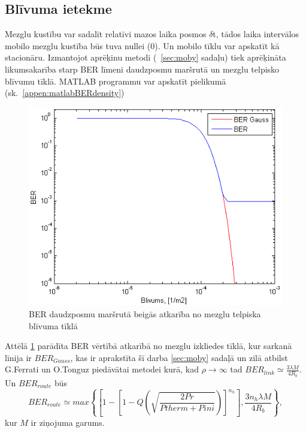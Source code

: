 \subsection{Blīvuma ietekme}
Mezglu kustību var sadalīt relatīvi mazos laika posmos $\delta$t, tādos laika intervālos mobilo mezglu kustība būs tuva nullei (0). Un mobilo tīklu var apskatīt kā stacionāru. Izmantojot aprēķinu metodi (\seename ~\ref{sec:moby} sadaļu) tiek aprēķināta likumsakarība starp BER līmeni daudzposmu maršrutā un mezglu telpisko blīvumu tīklā. MATLAB programmu var apskatīt pielikumā (sk.~\ref{appen:matlabBERdensity})
\begin{figure}[!htb]
  \centering
\includegraphics[scale=0.7]{./graph/blivBER.png}
\caption{BER daudzposmu maršrutā beigās atkarība no mezglu telpiska blīvuma tīklā}\label{fig:bliv}
\end{figure}

Attēlā \ref{fig:bliv} parādīta BER vērtībā atkarībā no mezglu izkliedes tīklā, kur sarkanā līnija ir $BER_{Gauss}$, kas ir aprakstīta šī darba \ref{sec:moby} sadaļā un zilā atbilst G.Ferrati un O.Tonguz piedāvātai metodei \cite{qoS_mobility} kurā, kad $\rho\rightarrow\infty$  tad $BER_{link} \simeq \frac{3\lambda M}{4R_{b}}$. Un $BER_{route}$ būs
\begin{equation}
 BER_{route}\simeq max \left \{  \left[ 1- \left[1-Q\left(\sqrt {\frac{2Pr}{Ptherm+Pini}}\right)\right]^{n_{h}}\right], \frac{3n_{h}\lambda M}{4R_{b}}\right \},
\end{equation}
kur $M$ ir ziņojuma garums.

